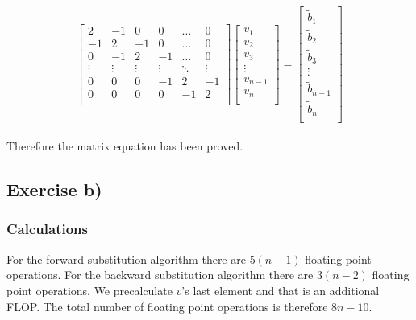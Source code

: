 \documentclass{article}
\begin{document}
  \begin{equation*}
    \begin{bmatrix}
      2 & -1 & 0 & 0 & \dots & 0 \\
      -1 & 2 & -1 & 0 & \dots & 0 \\
      0 & -1 & 2 & -1 & \dots & 0 \\
      \vdots & \vdots & \vdots & \vdots & \ddots & \vdots \\
      0 & 0 & 0 & -1 & 2 & -1 \\
      0 & 0 & 0 & 0 & -1 & 2 \\
    \end{bmatrix}
    \begin{bmatrix}
      v_1 \\
      v_2 \\
      v_3 \\
      \vdots \\
      v_{n-1} \\
      v_n \\
    \end{bmatrix}
    =
    \begin{bmatrix}
      \tilde{b}_1 \\
      \tilde{b}_2 \\
      \tilde{b}_3 \\
      \vdots \\
      \tilde{b}_{n-1} \\
      \tilde{b}_n \\
    \end{bmatrix}
  \end{equation*} \\

  Therefore the matrix equation has been proved. \\

\subsection{Exercise b)}

  \subsubsection{Calculations}

    For the forward substitution algorithm there are $5(n-1)$ floating point operations. For the backward substitution algorithm there are $3(n-2)$ floating point operations. We precalculate $v$'s last element and that is an additional FLOP. The total number of floating point operations is therefore $8n - 10$. \\
\end{document}
